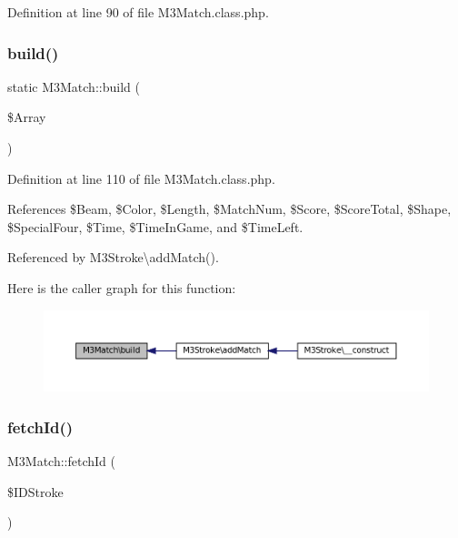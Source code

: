 Definition at line 90 of file M3\+Match.\+class.\+php.

\mbox{\label{class_m3_match_a06b58fe50392d408a41c04c66dcd20fa}} 
\subsubsection{\texorpdfstring{build()}{build()}}
{\footnotesize\ttfamily static M3\+Match\+::build (\begin{DoxyParamCaption}\item[{}]{\$\+Array }\end{DoxyParamCaption})\hspace{0.3cm}{\ttfamily [static]}}



Definition at line 110 of file M3\+Match.\+class.\+php.



References \$\+Beam, \$\+Color, \$\+Length, \$\+Match\+Num, \$\+Score, \$\+Score\+Total, \$\+Shape, \$\+Special\+Four, \$\+Time, \$\+Time\+In\+Game, and \$\+Time\+Left.



Referenced by M3\+Stroke\textbackslash{}add\+Match().

Here is the caller graph for this function\+:\nopagebreak
\begin{figure}[H]
\begin{center}
\leavevmode
\includegraphics[width=350pt]{class_m3_match_a06b58fe50392d408a41c04c66dcd20fa_icgraph}
\end{center}
\end{figure}
\mbox{\label{class_m3_match_a43c3f9c8f276a069911effc919d77911}} 
\subsubsection{\texorpdfstring{fetch\+Id()}{fetchId()}}
{\footnotesize\ttfamily M3\+Match\+::fetch\+Id (\begin{DoxyParamCaption}\item[{}]{\$\+I\+D\+Stroke }\end{DoxyParamCaption})\hspace{0.3cm}{\ttfamily [private]}}



